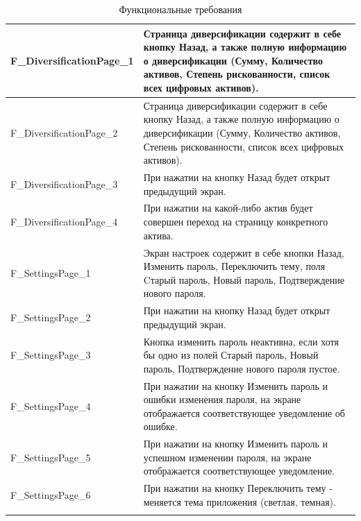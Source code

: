 \documentclass[a4paper, 14pt]{article}
\begin{document}
\begin{longtable}{| p{} | p{} |}
    F\_DiversificationPage\_1       & Страница диверсификации содержит в себе кнопку Назад, а также полную информацию о диверсификации (Сумму, Количество активов, Степень рискованности, список всех цифровых активов). \\ \hline
    F\_DiversificationPage\_2       & Страница диверсификации содержит в себе кнопку Назад, а также полную информацию о диверсификации (Сумму, Количество активов, Степень рискованности, список всех цифровых активов). \\ \hline
    F\_DiversificationPage\_3       & При нажатии на кнопку Назад будет открыт предыдущий экран.                                                                                                                         \\ \hline
    F\_DiversificationPage\_4       & При нажатии на какой-либо актив будет совершен переход на страницу конкретного актива.                                                                                             \\ \hline

    F\_SettingsPage\_1              & Экран настроек содержит в себе кнопки Назад, Изменить пароль, Переключить тему, поля Cтарый пароль, Новый пароль, Подтверждение нового пароля.                                     \\ \hline
    F\_SettingsPage\_2              & При нажатии на кнопку Назад будет открыт предыдущий экран.                                                                                                                         \\ \hline
    F\_SettingsPage\_3              & Кнопка изменить пароль неактивна, если хотя бы одно из полей Старый пароль, Новый пароль, Подтверждение нового пароля пустое.                                                      \\ \hline
    F\_SettingsPage\_4              & При нажатии на кнопку Изменить пароль и ошибки изменения пароля, на экране отображается соответствующее уведомление об ошибке.                                                     \\ \hline
    F\_SettingsPage\_5              & При нажатии на кнопку Изменить пароль и успешном изменении пароля, на экране отображается соответствующее уведомление.                                                             \\ \hline
    F\_SettingsPage\_6              & При нажатии на кнопку Переключить тему - меняется тема приложения (светлая, темная).                                                                                               \\ \hline
    \caption{Функциональные требования}
\end{longtable}
\end{document}
